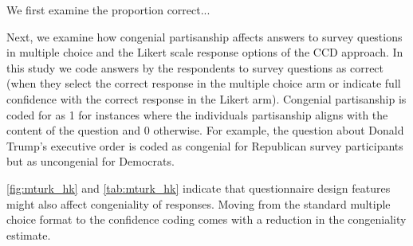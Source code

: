 \documentclass[12pt, letterpaper]{article}
\begin{document}
We first examine the proportion correct...

Next, we examine how congenial partisanship affects answers to survey questions in multiple choice and the Likert scale response options of the CCD approach. In this study we code answers by the respondents to survey questions as correct (when they select the correct response in the multiple choice arm or indicate full confidence with the correct response in the Likert arm). Congenial partisanship is coded for as 1 for instances where the individuals partisanship aligns with the content of the question and 0 otherwise. For example, the question about Donald Trump's executive order is coded as congenial for Republican survey participants but as uncongenial for Democrats.

\cref{fig:mturk_hk} and \cref{tab:mturk_hk} indicate that questionnaire design features might also affect congeniality of responses. Moving from the standard multiple choice format to the confidence coding comes with a reduction in the congeniality estimate.

\end{document}
